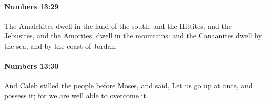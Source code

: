 		\paragraph{Numbers 13:29} %
			\label{NUMBERS-13-29}

			The Amalekites dwell in the land of the south: and the Hittites, and the Jebusites, and the Amorites, dwell in the mountains: and the Canaanites dwell by the sea, and by the coast of Jordan.


		\paragraph{Numbers 13:30} %
			\label{NUMBERS-13-30}

			And Caleb stilled the people before Moses, and said, Let us go up at once, and possess it; for we are well able to overcome it.


